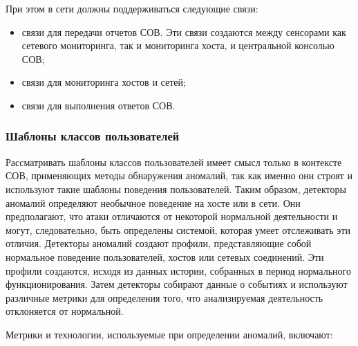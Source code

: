 При этом в сети должны поддерживаться следующие связи:

\begin{itemize}
	\item связи для передачи отчетов СОВ. Эти связи создаются между сенсорами как сетевого 
	мониторинга, так и мониторинга хоста, и центральной консолью СОВ;

	\item связи для мониторинга хостов и сетей;
	
	\item связи для выполнения ответов СОВ.
\end{itemize}



\subsubsection{Шаблоны классов пользователей}

Рассматривать шаблоны классов пользователей имеет смысл только в контексте СОВ, 
применяющих методы обнаружения аномалий, так как именно они строят и используют 
такие шаблоны поведения пользователей. Таким образом, детекторы аномалий определяют 
необычное поведение на хосте или в сети. Они предполагают, что атаки отличаются от 
некоторой нормальной деятельности и могут, следовательно, быть определены системой, 
которая умеет отслеживать эти отличия. Детекторы аномалий создают профили, представляющие 
собой нормальное поведение пользователей, хостов или сетевых соединений. Эти профили 
создаются, исходя из данных истории, собранных в период нормального функционирования. 
Затем детекторы собирают данные о событиях и используют различные метрики для определения 
того, что анализируемая деятельность отклоняется от нормальной.

Метрики и технологии, используемые при определении аномалий, включают:

